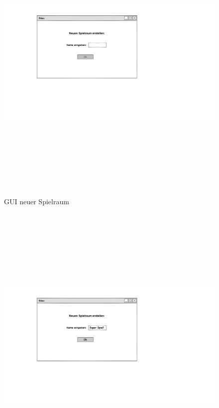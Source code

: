 \begin{center}
	\begin{figure}
		\includegraphics[width=170mm, height =140mm]{PencilProjectData/neuer_spielraum1}
		\caption{GUI neuer Spielraum}
	\end{figure}
	\begin{figure}
		\includegraphics[width=170mm, height =140mm]{PencilProjectData/neuer_spielraum2}

\end{figure}
\end{center}
